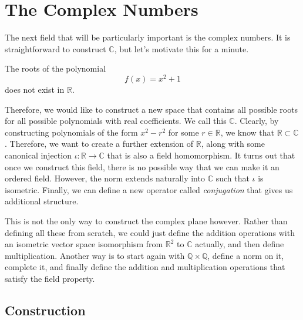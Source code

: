 \section{The Complex Numbers} 

  The next field that will be particularly important is the complex numbers. It is straightforward to construct $\mathbb{C}$, but let's motivate this for a minute. 

  \begin{example}
    The roots of the polynomial 
    \begin{equation}
      f(x) = x^2 + 1
    \end{equation}
    does not exist in $\mathbb{R}$. 
  \end{example} 

  Therefore, we would like to construct a new space that contains all possible roots for all possible polynomials with real coefficients. We call this $\mathbb{C}$. Clearly, by constructing polynomials of the form $x^2 - r^2$ for some $r \in \mathbb{R}$, we know that $\mathbb{R} \subset \mathbb{C}$. Therefore, we want to create a further extension of $\mathbb{R}$, along with some canonical injection $\iota: \mathbb{R} \rightarrow \mathbb{C}$ that is also a field homomorphism. It turns out that once we construct this field, there is no possible way that we can make it an ordered field. However, the norm extends naturally into $\mathbb{C}$ such that $\iota$ is isometric. Finally, we can define a new operator called \textit{conjugation} that gives us additional structure. 

  This is not the only way to construct the complex plane however. Rather than defining all these from scratch, we could just define the addition operations with an isometric vector space isomorphism from $\mathbb{R}^2$ to $\mathbb{C}$ actually, and then define multiplication. Another way is to start again with $\mathbb{Q} \times \mathbb{Q}$, define a norm on it, complete it, and finally define the addition and multiplication operations that satisfy the field property.   

\subsection{Construction}

